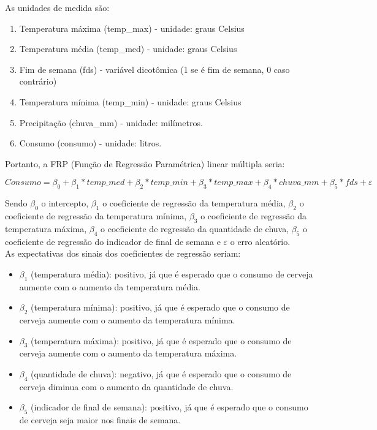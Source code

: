 \documentclass[a4paper, 12pt]{article}
\begin{document}
As unidades de medida são:

\begin{enumerate}
    \item Temperatura máxima (temp\_max) - unidade: graus Celsius
    \item Temperatura média (temp\_med) - unidade: graus Celsius
    \item Fim de semana (fds) - variável dicotômica (1 se é fim de semana, 0 caso contrário)
    \item Temperatura mínima (temp\_min) - unidade: graus Celsius
    \item Precipitação (chuva\_mm) - unidade: milímetros.
    \item Consumo (consumo) - unidade: litros.
\end{enumerate}

Portanto, a FRP (Função de Regressão Paramétrica) linear múltipla seria:

\begin{equation}\label{especificação da FRP}
    Consumo = \beta_0 + \beta_1*temp\_med + \beta_2*temp\_min + \beta_3*temp\_max + \beta_4*chuva\_mm + \beta_5*fds + \varepsilon
\end{equation}

Sendo $\beta_0$ o intercepto, $\beta_1$ o coeficiente de regressão da temperatura média, $\beta_2$ o coeficiente de regressão da temperatura mínima, $\beta_3$ o coeficiente de regressão da temperatura máxima, $\beta_4$ o coeficiente de regressão da quantidade de chuva, $\beta_5$ o coeficiente de regressão do indicador de final de semana e $\varepsilon$ o erro aleatório.\\

As expectativas dos sinais dos coeficientes de regressão seriam:\\

\begin{itemize}
    \item $\beta_1$ (temperatura média): positivo, já que é esperado que o consumo de cerveja aumente com o aumento da temperatura média.
    \item $\beta_2$ (temperatura mínima): positivo, já que é esperado que o consumo de cerveja aumente com o aumento da temperatura mínima.
    \item $\beta_3$ (temperatura máxima): positivo, já que é esperado que o consumo de cerveja aumente com o aumento da temperatura máxima.
    \item $\beta_4$ (quantidade de chuva): negativo, já que é esperado que o consumo de cerveja diminua com o aumento da quantidade de chuva.
    \item $\beta_5$ (indicador de final de semana): positivo, já que é esperado que o consumo de cerveja seja maior nos finais de semana.
\end{itemize}
\end{document}
